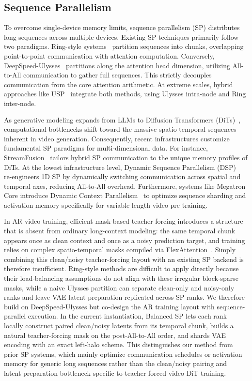 \documentclass{llmxive}
\begin{document}
\subsection{Sequence Parallelism}
To overcome single-device memory limits, sequence parallelism (SP) distributes long sequences across multiple devices. Existing SP techniques primarily follow two paradigms. Ring-style systems~\cite{li2023sequence, liu2023ring, liu2024startrail, gu2024loongtrain, longvila, longrl} partition sequences into chunks, overlapping point-to-point communication with attention computation. Conversely, DeepSpeed-Ulysses~\cite{jacobs2023deepspeed} partitions along the attention head dimension, utilizing All-to-All communication to gather full sequences. This strictly decouples communication from the core attention arithmetic. At extreme scales, hybrid approaches like USP~\cite{fang2024usp} integrate both methods, using Ulysses intra-node and Ring inter-node.

As generative modeling expands from LLMs to Diffusion Transformers (DiTs)~\cite{peebles2023scalable, ma2024latte}, computational bottlenecks shift toward the massive spatio-temporal sequences inherent in video generation. 
Consequently, recent infrastructures customize fundamental SP paradigms for multi-dimensional data. 
For instance, StreamFusion~\cite{yang2026streamfusion} tailors hybrid SP communication to the unique memory profiles of DiTs. 
At the lowest infrastructure level, Dynamic Sequence Parallelism (DSP)~\cite{zhao2024dsp} re-engineers 1D SP by dynamically switching communication across spatial and temporal axes, reducing All-to-All overhead. 
Furthermore, systems like Megatron Core introduce Dynamic Context Parallelism~\cite{nvidia2026dynamiccp} to optimize sequence sharding and activation memory specifically for variable-length video pre-training.


In AR video training, efficient mask-based teacher forcing introduces a structure that is absent from ordinary long-context modeling: the same temporal chunk appears once as clean context and once as a noisy prediction target, and training relies on complex spatio-temporal masks compiled via FlexAttention~\cite{dong2024flex}.
Simply combining this clean/noisy teacher-forcing layout with an existing SP backend is therefore insufficient.
Ring-style methods are difficult to apply directly because their load-balancing assumptions do not align with these irregular block-sparse masks, while a naive Ulysses partition can separate clean-only and noisy-only ranks and leave VAE latent preparation replicated across SP ranks.
We therefore build on DeepSpeed-Ulysses but co-design the AR training layout with sequence-parallel execution. In the current instantiation, Balanced SP lets each rank locally construct paired clean/noisy latents from its temporal chunk, builds a natural teacher-forcing mask on the post-All-to-All order, and shards VAE encoding with an exact left-halo scheme.
This distinguishes our method from prior SP systems, which mainly optimize communication schedules or activation memory for generic long sequences rather than the clean/noisy pairing and latent-preparation bottleneck specific to teacher-forced video DiT training.
\end{document}
